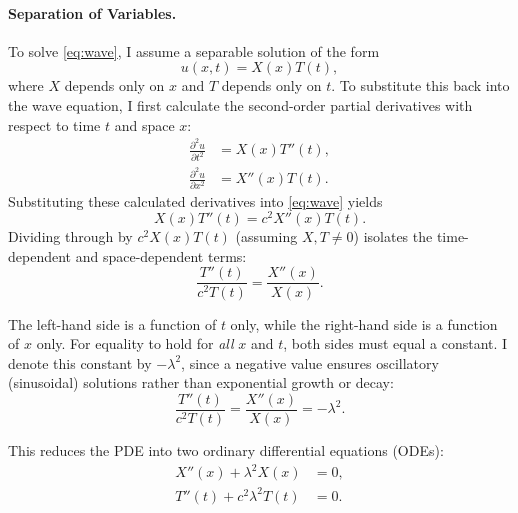 \documentclass{article}
\begin{document}
\paragraph{Separation of Variables.} 
To solve \eqref{eq:wave}, I assume a separable solution of the form
\begin{equation}
    u(x,t) = X(x)T(t),
\end{equation}
where $X$ depends only on $x$ and $T$ depends only on $t$. To substitute this back into the wave equation, I first calculate the second-order partial derivatives with respect to time $t$ and space $x$:
\begin{align}
    \frac{\partial^2 u}{\partial t^2} &= X(x)T''(t), \\
    \frac{\partial^2 u}{\partial x^2} &= X''(x)T(t).
\end{align}
Substituting these calculated derivatives into \eqref{eq:wave} yields
\begin{equation}
    X(x) T''(t) = c^2 X''(x) T(t).
\end{equation}
Dividing through by $c^2 X(x)T(t)$ (assuming $X,T \neq 0$) isolates the time-dependent and space-dependent terms:
\begin{equation}
    \frac{T''(t)}{c^2 T(t)} = \frac{X''(x)}{X(x)}.
\end{equation}

The left-hand side is a function of $t$ only, while the right-hand side is a function of $x$ only. For equality to hold for \emph{all} $x$ and $t$, both sides must equal a constant. I denote this constant by $-\lambda^2$, since a negative value ensures oscillatory (sinusoidal) solutions rather than exponential growth or decay:
\begin{equation}
    \frac{T''(t)}{c^2 T(t)} = \frac{X''(x)}{X(x)} = -\lambda^2.
\end{equation}

This reduces the PDE into two ordinary differential equations (ODEs):
\begin{align}
    X''(x) + \lambda^2 X(x) &= 0, \label{eq:Xode}\\
    T''(t) + c^2 \lambda^2 T(t) &= 0. \label{eq:Tode}
\end{align}
\end{document}
